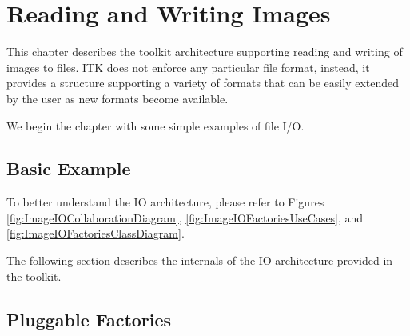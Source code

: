 \chapter{Reading and Writing Images}
\label{sec:IO}

This chapter describes the toolkit architecture supporting reading and
writing of images to files. ITK does not enforce any particular file format,
instead, it provides a structure supporting a variety of formats that can
be easily extended by the user as new formats become available.

We begin the chapter with some simple examples of file I/O.

\section{Basic Example}
\label{sec:ImagReadWrite}
%

To better understand the IO architecture, please refer to Figures 
\ref{fig:ImageIOCollaborationDiagram}, 
\ref{fig:ImageIOFactoriesUseCases}, and
\ref{fig:ImageIOFactoriesClassDiagram}. 





The following section describes the internals of the IO architecture provided
in the toolkit.

\section{Pluggable Factories}
\label{sec:ImageIOPluggableFactories}

